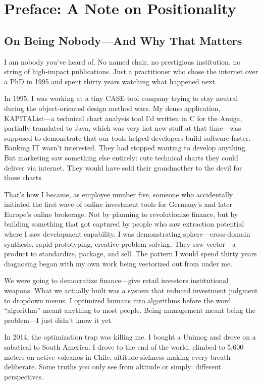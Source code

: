 \section*{Preface: A Note on Positionality}

\subsection*{On Being Nobody---And Why That Matters}

I am nobody you've heard of. No named chair, no prestigious institution, no string of high-impact publications. Just a practitioner who chose the internet over a PhD in 1995 and spent thirty years watching what happened next.

In 1995, I was working at a tiny CASE tool company trying to stay neutral during the object-oriented design method wars. My demo application, KAPITAList---a technical chart analysis tool I'd written in C for the Amiga, partially translated to Java, which was very hot new stuff at that time---was supposed to demonstrate that our tools helped developers build software faster. Banking IT wasn't interested. They had stopped wanting to develop anything. But marketing saw something else entirely: cute technical charts they could deliver via internet. They would have sold their grandmother to the devil for those charts.

That's how I became, as employee number five, someone who accidentally initiated the first wave of online investment tools for Germany's and later Europe's online brokerage. Not by planning to revolutionize finance, but by building something that got captured by people who saw extraction potential where I saw development capability. I was demonstrating sphere---cross-domain synthesis, rapid prototyping, creative problem-solving. They saw vector---a product to standardize, package, and sell. The pattern I would spend thirty years diagnosing began with my own work being vectorized out from under me.

We were going to democratize finance---give retail investors institutional weapons. What we actually built was a system that reduced investment judgment to dropdown menus. I optimized humans into algorithms before the word ``algorithm'' meant anything to most people. Being management meant being the problem---I just didn't know it yet.

In 2014, the optimization trap was killing me. I bought a Unimog and drove on a sabatical to South America. I drove to the end of the world, climbed to 5,600 meters on active volcanos in Chile, altitude sickness making every breath deliberate. Some truths you only see from altitude or simply: different perspectives.

